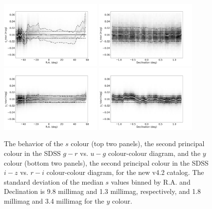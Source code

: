 \documentclass[fleqn,usenatbib]{mnras}
\begin{document}
\begin{figure}
    \centering\includegraphics[width=0.45\textwidth]{figures/testV26vsV42_snew_u_s_new_RA_Hess.png}
    \centering\includegraphics[width=0.45\textwidth]{figures/testV26vsV42_snew_u_s_new_Dec_Hess.png} 
    \centering\includegraphics[width=0.45\textwidth]{figures/testV26vsV42_ynew_z_y_new_RA_Hess.png} 
    \centering\includegraphics[width=0.45\textwidth]{figures/testV26vsV42_ynew_z_y_new_Dec_Hess.png}  
\caption{The behavior of the $s$ colour (top two panels), the second principal colour in the SDSS
$g-r$ vs. $u-g$ colour-colour diagram, and the $y$ colour (bottom two panels), the second 
principal colour in the SDSS $i-z$ vs. $r-i$ colour-colour diagram, for the new v4.2 catalog.
The standard deviation of the median $s$ values binned by R.A. and Declination is 9.8 millimag 
and 1.3 millimag, respectively, and 1.8 millimag and 3.4 millimag for the $y$ colour.}
\label{fig:comparesy} 
\end{figure}
\end{document}
